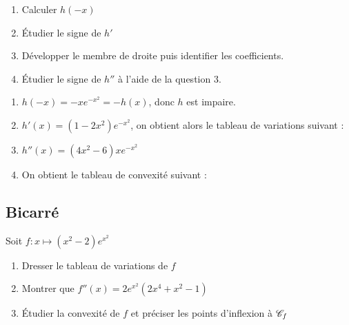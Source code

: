 \documentclass[oneside,12pt]{book}          %
\begin{document}
\begin{hint}
	\begin{enumerate}
		\item Calculer $h(-x)$
		\item Étudier le signe de $h'$
		\item Développer le membre de droite puis identifier les coefficients.
		\item Étudier le signe de $h''$ à l'aide de la question 3.
	\end{enumerate}
\end{hint}
\begin{sol}
	\begin{enumerate}
		\item $h(-x)=-xe^{-x^2}=-h(x)$, donc $h$ est impaire.
		\item $h'(x)=(1-2x^2)e^{-x^2}$, on obtient alors le tableau de variations suivant :
		
		\item $h''(x)=(4x^2-6)xe^{-x^2}$
		\item On obtient le tableau de convexité suivant :
		
	\end{enumerate}
\end{sol}



\subsection{Bicarré}
Soit $ f : x \mapsto (x^2-2) e^{x^2} $
\begin{enumerate}
    \item Dresser le tableau de variations de $ f $
    \item Montrer que $ f''(x) = 2e^{x^2} (2x^4 + x^2 - 1) $
    \item Étudier la convexité de $f$ et préciser les points d'inflexion à ${\mathscr{C}}_f$
\end{enumerate}
\end{document}

